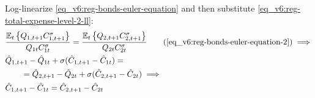 \documentclass[../thesis.tex]{subfiles}
\begin{document}
Log-linearize \ref{eq_v6:reg-bonds-euler-equation} and then substitute \ref{eq_v6:reg-total-expense-level-2-ll}:
\begin{align}
	& \frac{\mathbb{E}_{t} \left\{ Q_{1, t+1} C_{1, t+1}^{\sigma} \right\}}{Q_{1t} C_{1t}^{\sigma}} = \frac{\mathbb{E}_{t} \left\{ Q_{2, t+1} C_{2, t+1}^{\sigma} \right\}}{Q_{2t} C_{2t}^{\sigma}} \tag{\ref{eq_v6:reg-bonds-euler-equation-2}} \implies \\
	& \hat{Q}_{1, t+1} - \hat{Q}_{1t} + \sigma (\hat{C}_{1, t+1} - \hat{C}_{1t}) = \nonumber \\ 
	&\qquad = \hat{Q}_{2, t+1} - \hat{Q}_{2t} + \sigma (\hat{C}_{2, t+1} - \hat{C}_{2t}) \implies \nonumber \\
	& \hat{C}_{1, t+1} - \hat{C}_{1t} = \hat{C}_{2, t+1} - \hat{C}_{2t} \label{eq_v6:reg-bonds-euler-equation-2-ll}
\end{align}


\begin{comment}
	
\subsubsection*{Euler equation for the capital return}

Log-linearize \ref{eq_v6:reg-capital-euler-equation}:
\begin{alignat}{2}
	& \frac{ C_{\eta t}^{1-\sigma}}{Q_{\eta t}} P_{\eta t} = \beta \mathbb{E}_t \left\{ \frac{ C_{\eta, t+1}^{1-\sigma}}{Q_{\eta, t+1}} [(1-\delta) P_{\eta, t+1} + R_{K,t+1}] \right\} \implies \tag{\ref{eq_v6:reg-capital-euler-equation}} \\
	& \frac{P_{\eta t} C_{\eta t}^{1-\sigma}}{Q_{\eta t}} \mathbb{E}_t \left\{ \frac{\te[t+1]}{P_{\eta, t+1} C_{\eta, t+1}^{1-\sigma}} \right\} = \beta \left[ (1-\delta) + \mathbb{E}_t \left\{ \frac{R_{K,t+1}}{P_{\eta, t+1}} \right\} \right] \implies \nonumber \\
	& \frac{P_{\eta} C_{\eta}^{1-\sigma}}{\te[]} \cdot \frac{\te[]}{P_{\eta} C_{\eta}^{1-\sigma}} (1 + \hat{P}_{\eta t} + (1 -\sigma) \hat{C}_{\eta t} - \hat{\mathscr{E}}_{\eta t} + \nonumber \\ 
	& \qquad + \E \{\hat{\mathscr{E}}_{\eta, t+1} - \hat{P}_{\eta, t+1} - (1 -\sigma) \hat{C}_{\eta, t+1}\}) = \nonumber \\
	& \qquad = \beta \left[ (1-\delta) + \frac{R_{K}}{P_{\eta}} \mathbb{E}_t \left\{ 1 + \hat{R}_{K, t+1} -\hat{P}_{\eta, t+1} \right\} \right] \implies \nonumber \\
	& \E \left\{ \hat{\mathscr{E}}_{\eta, t+1} - \hat{P}_{\eta, t+1}  - (1 -\sigma) \hat{C}_{\eta, t+1} \right\} - (\hat{\mathscr{E}}_{\eta t} - \hat{P}_{\eta t} - (1 -\sigma) \hat{C}_{\eta t}) = \nonumber \\
	& \qquad = \beta r_{K} \mathbb{E}_t \left\{ \hat{R}_{K, t+1} - \hat{P}_{\eta, t+1} \right\} \label{eq_v6:reg-ll-capital-euler-equation} \\
	& \qquad \text{where: } r_{K} = \frac{R_{K}}{P_{}} \label{eq_v6:reg-rk}
\end{alignat}	
	
\end{comment}
	
\end{document}
